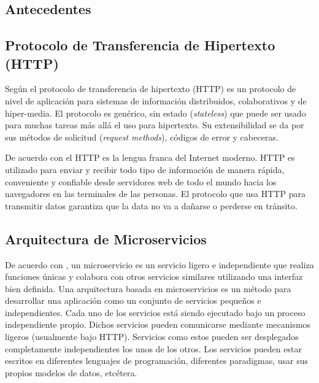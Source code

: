 
\subsection{Antecedentes}

%
%
%


\subsection{Protocolo de Transferencia de Hipertexto (HTTP)}

Según \cite{goralski2017illustrated} el protocolo de transferencia de hipertexto (HTTP) es un protocolo de nivel de aplicación para sistemas de información
distribuidos, colaborativos y de hiper-media.
El protocolo es genérico, sin estado ({\it stateless}) que puede ser usado para muchas tareas más allá el uso para hipertexto.
Su extensibilidad se da por sus métodos de solicitud ({\it request methods}), códigos de error y cabeceras.

De acuerdo con \cite{gourley2002http} el HTTP es la lengua franca del Internet moderno.
HTTP es utilizado para enviar y recibir todo tipo de información de manera rápida, conveniente y confiable
desde servidores web de todo el mundo hacia los navegadores en las terminales de las personas.
El protocolo que usa HTTP para transmitir datos garantiza que la data no va a dañarse o perderse en
tránsito.


\subsection{Arquitectura de Microservicios}

De acuerdo con \cite{dmitry2014micro}, un microservicio es un servicio ligero e independiente que
realiza funciones únicas y colabora con otros servicios similares utilizando una interfaz bien definida.
Una arquitectura basada en microservicios es un método para desarrollar una aplicación como un conjunto
de servicios pequeños e independientes. Cada uno de los servicios está siendo ejecutado bajo un
proceso independiente propio. Dichos servicios pueden comunicarse mediante mecanismos ligeros (usualmente
bajo HTTP). Servicios como estos pueden ser desplegados completamente independientes los unos de los otros.
Los servicios pueden estar escritos en diferentes lenguajes de programación, diferentes paradigmas,
usar sus propios modelos de datos, etcétera.

